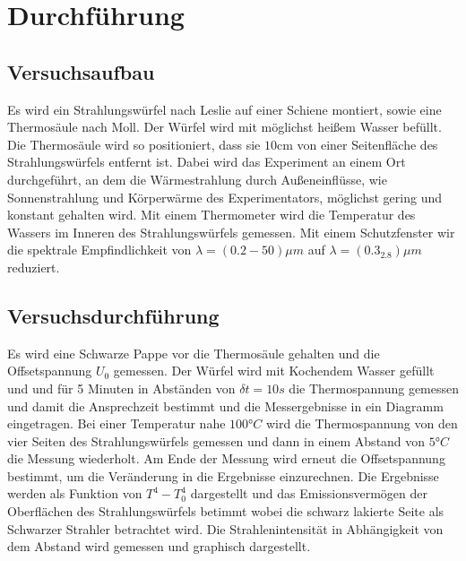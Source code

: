 \section{Durchführung}
\label{sec:Durchführung}
\subsection{Versuchsaufbau}
Es wird ein Strahlungswürfel nach Leslie auf einer Schiene montiert, sowie eine
Thermosäule nach Moll. Der Würfel wird mit möglichst heißem Wasser befüllt. Die
Thermosäule wird so positioniert, dass sie $10\si{\centi\meter}$ von einer
Seitenfläche des Strahlungswürfels entfernt ist. Dabei wird das Experiment an
einem Ort durchgeführt, an dem die Wärmestrahlung durch Außeneinflüsse, wie
Sonnenstrahlung und Körperwärme des Experimentators, möglichst gering und konstant
gehalten wird. Mit einem Thermometer wird die Temperatur des Wassers im Inneren
des Strahlungswürfels gemessen. Mit einem Schutzfenster wir die spektrale
Empfindlichkeit von $\lambda=(0.2-50)\mu m$ auf $\lambda=(0.3_2.8)\mu m$ reduziert.


\subsection{Versuchsdurchführung}
Es wird eine Schwarze Pappe vor die Thermosäule gehalten und die Offsetspannung
$U_0$ gemessen.
Der Würfel wird mit Kochendem Wasser gefüllt und und für 5 Minuten in Abständen
von $\delta t =10s$ die Thermospannung gemessen und damit die Ansprechzeit
bestimmt und die Messergebnisse in ein Diagramm eingetragen.
Bei einer Temperatur nahe $100°C$ wird die Thermospannung von den vier
Seiten des Strahlungswürfels gemessen und dann in einem Abstand von $5°C$ die
Messung wiederholt. Am Ende der Messung wird erneut die Offsetspannung bestimmt,
um die Veränderung in die Ergebnisse einzurechnen. Die Ergebnisse werden als
Funktion von $T^4-T_0^4$ dargestellt und das Emissionsvermögen der Oberflächen
des Strahlungswürfels betimmt wobei die schwarz lakierte Seite als
Schwarzer Strahler betrachtet wird.
Die Strahlenintensität in Abhängigkeit von dem Abstand wird gemessen und
graphisch dargestellt.

